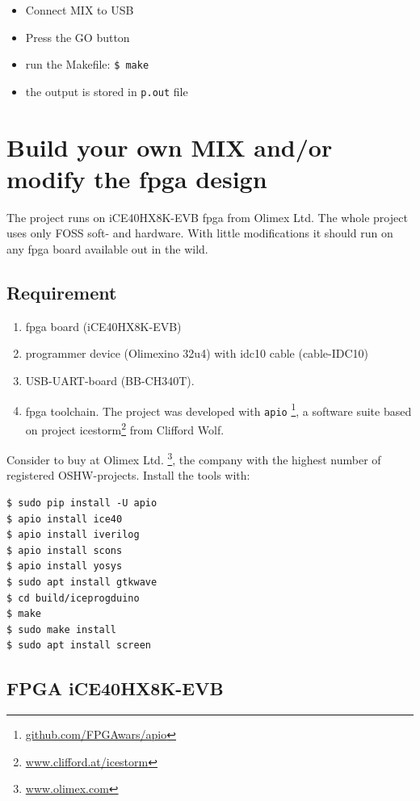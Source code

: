 \documentclass[a4paper,ngerman]{scrartcl}
\begin{document}
\begin{itemize}
	\item Connect MIX to USB
	\item Press the GO button
	\item run the Makefile: \lstinline|$ make|
	\item the output is stored in \lstinline|p.out| file
\end{itemize}


\section{Build your own MIX and/or modify the fpga design}

The project runs on iCE40HX8K-EVB fpga from Olimex Ltd. The whole project uses only FOSS soft- and hardware. With little modifications it should run on any fpga board available out in the wild.

\subsection{Requirement}
\begin{enumerate}
	\item 
	fpga board (iCE40HX8K-EVB)
	\item programmer device (Olimexino 32u4) with idc10 cable (cable-IDC10)
	\item USB-UART-board (BB-CH340T).  
	\item fpga toolchain. The project was developed with \lstinline|apio| \footnote{\href{github.com/FPGAwars/apio}{github.com/FPGAwars/apio}}, a software suite based on project icestorm\footnote{\href{www.clifford.at/icestorm}{www.clifford.at/icestorm}} from Clifford Wolf.
\end{enumerate}

Consider to buy at Olimex Ltd. \footnote{\href{www.olimex.com}{www.olimex.com}}, the company with the highest number of registered OSHW-projects. Install the tools with:

\begin{lstlisting}[numbers=none,frame=none]
$ sudo pip install -U apio
$ apio install ice40
$ apio install iverilog
$ apio install scons
$ apio install yosys
$ sudo apt install gtkwave
$ cd build/iceprogduino
$ make
$ sudo make install
$ sudo apt install screen
\end{lstlisting}

\subsection{FPGA iCE40HX8K-EVB}
\end{document}
